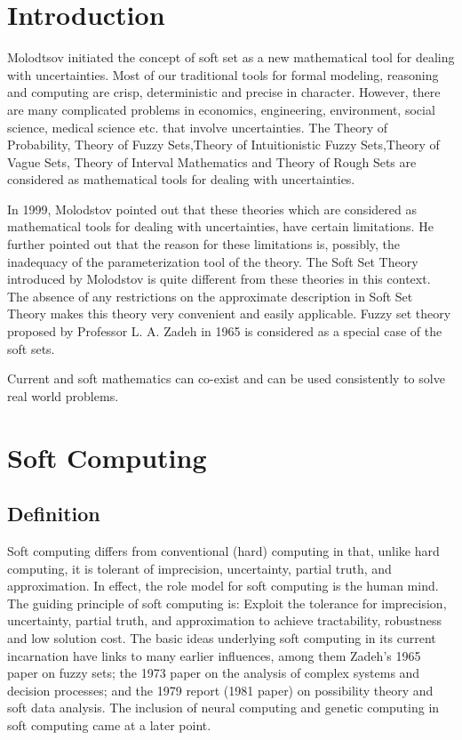 \documentclass[12pt]{article} %
\begin{document}
\maketitle
\setcounter{secnumdepth}{1}

\section{Introduction}
Molodtsov initiated the concept of soft set as a new mathematical tool for dealing with uncertainties. Most of our traditional tools for formal modeling, reasoning and computing are crisp, deterministic and precise in character. However, there are many complicated problems in economics,
engineering, environment, social science, medical science etc.
that involve uncertainties. The Theory of Probability, Theory of
Fuzzy Sets,Theory of Intuitionistic Fuzzy Sets,Theory of Vague
Sets, Theory of Interval Mathematics and Theory of Rough Sets
are considered as mathematical tools for dealing with
uncertainties.

In 1999, Molodstov pointed out that these
theories which are considered as mathematical tools for dealing
with uncertainties, have certain limitations. He further pointed
out that the reason for these limitations is, possibly, the
inadequacy of the parameterization tool of the theory. The Soft
Set Theory introduced by Molodstov is quite different from
these theories in this context. The absence of any restrictions on
the approximate description in Soft Set Theory makes this
theory very convenient and easily applicable. Fuzzy set theory
proposed by Professor L. A. Zadeh in 1965 is considered as a
special case of the soft sets.

Current and soft mathematics can
co-exist and can be used consistently to solve real
world problems.


\section{Soft Computing}
\subsection{Definition}
Soft computing differs from conventional (hard) computing in that, unlike hard computing, it is tolerant of imprecision, uncertainty, partial truth, and approximation. In effect, the role model for soft computing is the human mind. The guiding principle of soft computing is: Exploit the tolerance for imprecision, uncertainty, partial truth, and approximation to achieve tractability, robustness and low solution cost. The basic ideas underlying soft computing in its current incarnation have links to many earlier influences, among them Zadeh's 1965 paper on fuzzy sets; the 1973 paper on the analysis of complex systems and decision processes; and the 1979 report (1981 paper) on possibility theory and soft data analysis. The inclusion of neural computing and genetic computing in soft computing came at a later point.
\end{document}
